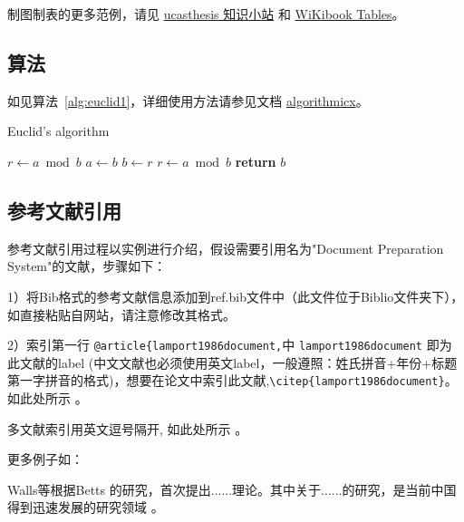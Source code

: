 制图制表的更多范例，请见 \href{https://github.com/mohuangrui/ucasthesis/wiki}{ucasthesis 知识小站} 和 \href{https://en.wikibooks.org/wiki/LaTeX/Tables}{WiKibook Tables}。

\subsection{算法}

如见算法~\ref{alg:euclid1}，详细使用方法请参见文档 \href{https://ctan.org/pkg/algorithmicx?lang=en}{algorithmicx}。

\begin{algorithm}[htbp]
    \small
    \caption{Euclid's algorithm}\label{alg:euclid1}
    \begin{algorithmic}[1]
        \State $r\gets a\bmod b$
        \State $a\gets b$
        \State $b\gets r$
        \State $r\gets a\bmod b$
        \EndWhile\label{eucliden1dwhile}
        \State \textbf{return} $b$
        \EndProcedure
    \end{algorithmic}
\end{algorithm}

\subsection{参考文献引用}

参考文献引用过程以实例进行介绍，假设需要引用名为"Document Preparation System"的文献，步骤如下：

1）将Bib格式的参考文献信息添加到ref.bib文件中（此文件位于Biblio文件夹下），如直接粘贴自网站，请注意修改其格式。

2）索引第一行 \verb|@article{lamport1986document,|中 \verb|lamport1986document| 即为此文献的label (中文文献也必须使用英文label，一般遵照：姓氏拼音+年份+标题第一字拼音的格式)，想要在论文中索引此文献,\verb|\citep{lamport1986document}|。如此处所示 \citep{lamport1986document}。

多文献索引用英文逗号隔开, 如此处所示 \citep{lamport1986document, chu2004tushu, chen2005zhulu}。

更多例子如：

Walls等\citep{walls2013drought}根据Betts\citep{betts2005aging} 的研究，首次提出......理论。其中关于......的研究\citep{walls2013drought, betts2005aging}，是当前中国得到迅速发展的研究领域 \citep{chen1980zhongguo, bravo1990comparative}。

